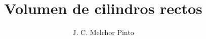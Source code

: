 \documentclass[12pt]{guia}
\title{Volumen de cilindros rectos}
\author{J. C. Melchor Pinto}
\begin{document}
\pagestyle{headandfoot}
\addpoints
\INFO
\printanswers
\begin{questions}
    
    
    
    
    
    
    
    
    
    
    
    
\end{questions}

\end{document}
